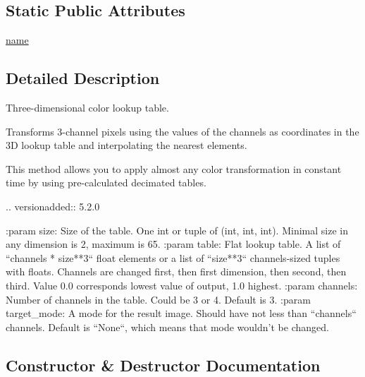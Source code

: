 \subsection*{Static Public Attributes}
\begin{DoxyCompactItemize}
\item 
\hyperlink{classPIL_1_1ImageFilter_1_1Color3DLUT_a2030ddd7963513d25cae84af74924013}{name}
\end{DoxyCompactItemize}


\subsection{Detailed Description}
\begin{DoxyVerb}Three-dimensional color lookup table.

Transforms 3-channel pixels using the values of the channels as coordinates
in the 3D lookup table and interpolating the nearest elements.

This method allows you to apply almost any color transformation
in constant time by using pre-calculated decimated tables.

.. versionadded:: 5.2.0

:param size: Size of the table. One int or tuple of (int, int, int).
             Minimal size in any dimension is 2, maximum is 65.
:param table: Flat lookup table. A list of ``channels * size**3``
              float elements or a list of ``size**3`` channels-sized
              tuples with floats. Channels are changed first,
              then first dimension, then second, then third.
              Value 0.0 corresponds lowest value of output, 1.0 highest.
:param channels: Number of channels in the table. Could be 3 or 4.
                 Default is 3.
:param target_mode: A mode for the result image. Should have not less
                    than ``channels`` channels. Default is ``None``,
                    which means that mode wouldn't be changed.
\end{DoxyVerb}
 

\subsection{Constructor \& Destructor Documentation}
\mbox{\label{classPIL_1_1ImageFilter_1_1Color3DLUT_ab70ae59c97e89d904b527cad95ed338b}} 
